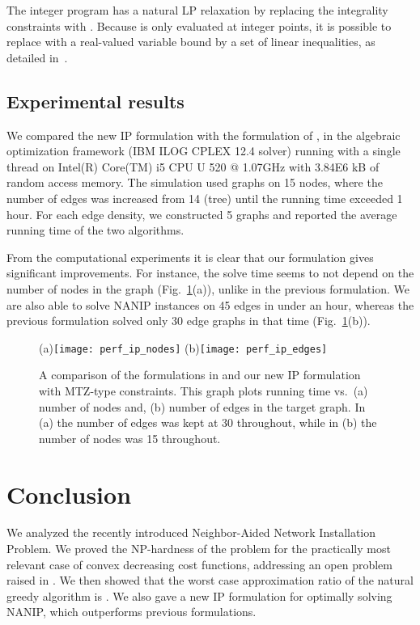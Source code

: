 \documentclass[english]{llncs}
\begin{document}
The integer program has a natural LP relaxation by replacing the integrality
constraints with . 
Because  is only evaluated at integer points, it is possible to replace 
with a real-valued variable bound by a set of linear inequalities, as detailed in~\cite{Gutfraind14}.

\subsection{Experimental results}

We compared the new IP formulation with the formulation of
\cite{Gutfraind14}, in the algebraic optimization framework
(IBM ILOG CPLEX 12.4 solver) running with a single thread on Intel(R) Core(TM)
i5 CPU U 520  @ 1.07GHz with 3.84E6 kB of random access memory.  The simulation
used graphs on 15 nodes, where the number of edges was increased from 14 (tree)
until the running time exceeded 1 hour.  For each edge density, we constructed
5 graphs and reported the average running time of the two algorithms.

From the computational experiments it is clear that our formulation gives
significant improvements.  For instance, the solve time seems to not depend on
the number of nodes in the graph (Fig.~\ref{fig:iptime}(a)), unlike in the
previous formulation.  We are also able to solve NANIP instances on 45 edges in
under an hour, whereas the previous formulation solved only 30 edge graphs in
that time (Fig.~\ref{fig:iptime}(b)).

\begin{figure}[th]
\begin{centering}
(a)\texttt{[image: perf\_ip\_nodes]} 
(b)\texttt{[image: perf\_ip\_edges]} 
\par
\end{centering}
\caption{A comparison of the formulations in
\cite{Gutfraind14} and our new IP formulation with MTZ-type
constraints.  This graph plots running time vs.\ (a) number of nodes and, (b)
number of edges in the target graph.
In (a) the number of edges was kept at 30 throughout, while in (b) the number
of nodes was 15 throughout.\label{fig:iptime}} 
\end{figure}


\section{Conclusion} \label{sec:concl}
We analyzed the recently introduced Neighbor-Aided Network Installation
Problem.  We proved the NP-hardness of the problem for the practically most
relevant case of convex decreasing cost functions, addressing an open problem
raised in \cite{Gutfraind14}.  We then showed that the worst case approximation
ratio of the natural greedy algorithm is .  We also gave a new IP
formulation for optimally solving NANIP, which outperforms previous
formulations.
\end{document}

